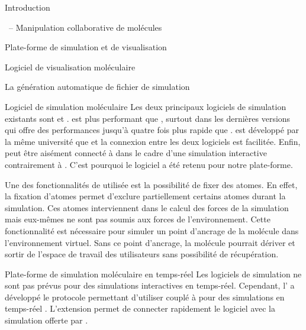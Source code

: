 \documentclass[myfrancais]{mythesis}
\begin{document}
\begin{mypart}{Introduction}
\begin{mychapter}{\myShaddock\ -- Manipulation collaborative de molécules}
\begin{mysection}{Plate-forme de simulation et de visualisation}
\begin{mysubsection}{Logiciel de visualisation moléculaire}
\begin{mysubsubsection}{La génération automatique de fichier de simulation}
					\end{mysubsubsection}
				\end{mysubsection}
				\begin{mysubsection}{Logiciel de simulation moléculaire}
					Les deux principaux logiciels de simulation existants sont   et \myGromacs {}.
					\myGromacs est plus performant que , surtout dans les dernières versions  qui offre des performances jusqu'à quatre fois plus rapide que .
					 est développé par la même université que  et la connexion entre les deux logiciels est facilitée.
					Enfin,  peut être aisément connecté à  dans le cadre d'une simulation interactive contrairement à \myGromacs.
					C'est pourquoi le logiciel  a été retenu pour notre plate-forme.

					Une des fonctionnalités de  utilisée est la possibilité de \og fixer \fg des atomes.
					En effet, la fixation d'atomes permet d'exclure partiellement certains atomes durant la simulation.
					Ces atomes interviennent dans le calcul des forces de la simulation mais eux-mêmes ne sont pas soumis aux forces de l'environnement.
					Cette fonctionnalité est nécessaire pour simuler un point d'ancrage de la molécule dans l'environnement virtuel.
					Sans ce point d'ancrage, la molécule pourrait dériver et sortir de l'espace de travail des utilisateurs sans possibilité de récupération.
					\begin{mysubsubsection}{Plate-forme de simulation moléculaire en temps-réel}
						Les logiciels de simulation ne sont pas prévus pour des simulations interactives en temps-réel.
						Cependant, l' a développé le protocole  permettant d'utiliser  couplé à  pour des simulations en temps-réel .
						L'extension  permet de connecter rapidement le logiciel  avec la simulation offerte par .


\end{mysubsubsection}
\end{mysubsection}
\end{mysection}
\end{mychapter}
\end{mypart}
\end{document}
